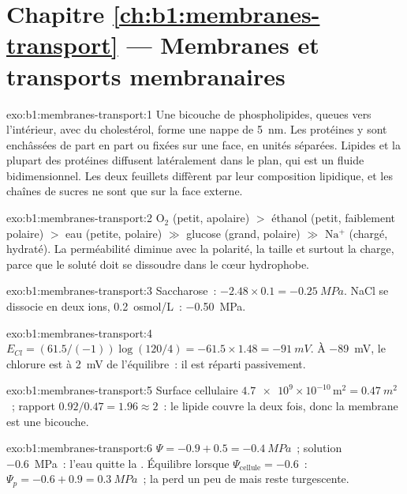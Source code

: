 \section*{Chapitre \ref{ch:b1:membranes-transport} --- Membranes et transports membranaires}

\begin{solution}{exo:b1:membranes-transport:1}
Une bicouche de phospholipides, queues vers l'intérieur, avec du
cholestérol, forme une nappe de \qty{5}{nm}. Les protéines y sont
enchâssées de part en part ou fixées sur une face, en unités séparées.
Lipides et la plupart des protéines diffusent latéralement dans le plan,
qui est un fluide bidimensionnel. Les deux feuillets diffèrent par leur
composition lipidique, et les chaînes de sucres ne sont que sur la face
externe.
\end{solution}

\begin{solution}{exo:b1:membranes-transport:2}
$\mathrm{O_2}$ (petit, apolaire) $>$ éthanol (petit, faiblement
polaire) $>$ eau (petite, polaire) $\gg$ glucose (grand, polaire) $\gg$
$\mathrm{Na^+}$ (chargé, hydraté). La perméabilité diminue avec la
polarité, la taille et surtout la charge, parce que le soluté doit se
dissoudre dans le cœur hydrophobe.
\end{solution}

\begin{solution}{exo:b1:membranes-transport:3}
Saccharose~: $-2.48\times 0.1 = \qty{-0.25}{MPa}$. NaCl se dissocie en
deux ions, \qty{0.2}{osmol/L}~: \qty{-0.50}{MPa}.
\end{solution}

\begin{solution}{exo:b1:membranes-transport:4}
$E_{Cl} = (61.5/(-1))\log(120/4) = -61.5\times 1.48 = \qty{-91}{mV}$.
À \qty{-89}{mV}, le chlorure est à \qty{2}{mV} de l'équilibre~: il est
réparti passivement.
\end{solution}

\begin{solution}{exo:b1:membranes-transport:5}
Surface cellulaire $\num{4.7e9}\times 10^{-10}\,\mathrm{m^2} =
\qty{0.47}{m^2}$~; rapport $0.92/0.47 = 1.96 \approx 2$~: le lipide
couvre la  deux fois, donc la membrane est une bicouche.
\end{solution}

\begin{solution}{exo:b1:membranes-transport:6}
 $\Psi = -0.9 + 0.5 = \qty{-0.4}{MPa}$~; solution
\qty{-0.6}{MPa}~: l'eau quitte la . Équilibre lorsque
$\Psi_{\text{cellule}} = -0.6$~: $\Psi_p = -0.6 + 0.9 = \qty{0.3}{MPa}$~;
la  perd un peu de  mais reste turgescente.
\end{solution}


